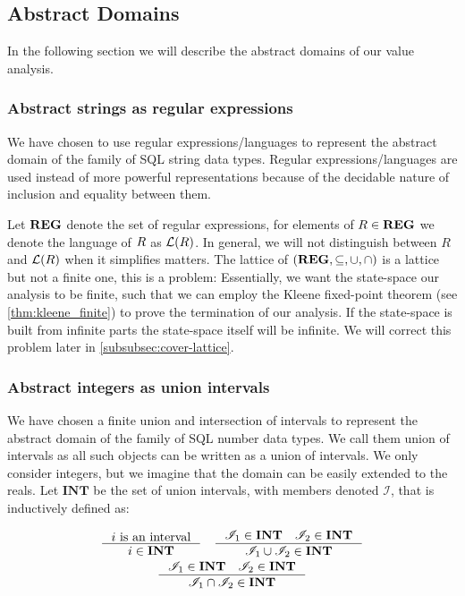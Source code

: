\subsection{Abstract Domains}\label{subsec:abstract-domains}

In the following section we will describe the abstract domains of our value analysis.

\subsubsection{Abstract strings as regular expressions}\label{subsubsec:abstract_domains_strings}
We have chosen to use regular expressions/languages to represent the abstract domain of the family of SQL string data types.
Regular expressions/languages are used instead of more powerful representations because of the decidable nature of inclusion and equality between them.

Let $\mathbf{REG}$ denote the set of regular expressions, for elements of $R \in \mathbf{REG}$ we denote the language of $R$ as $\mathcal{L}(R)$.
In general, we will not distinguish between $R$ and $\mathcal{L}(R)$ when it simplifies matters.
The lattice of $(\mathbf{REG}, \subseteq, \cup, \cap)$ is a lattice but not a finite one, this is a problem: Essentially, we want the state-space our analysis to be finite, such that we can employ the Kleene fixed-point theorem (see \autoref{thm:kleene_finite}) to prove the termination of our analysis.
If the state-space is built from infinite parts the state-space itself will be infinite.
We will correct this problem later in \autoref{subsubsec:cover-lattice}.

\subsubsection{Abstract integers as union intervals}\label{subsubsec:abstract_domains_numbers} We have chosen a finite union and intersection of intervals to represent the abstract domain of the family of SQL number data types.
We call them union of intervals as all such objects can be written as a union of intervals.
We only consider integers, but we imagine that the domain can be easily extended to the reals.
Let $\mathbf{INT}$ be the set of union intervals, with members denoted $\mathscr{I}$, that is inductively defined as:


\begin{gather*}
    \inference{i \text{ is an interval}}{i \in \mathbf{INT}} \quad
    \inference{\mathscr{I}_1 \in \textbf{INT} \quad \mathscr{I}_2 \in \textbf{INT}}{\mathscr{I}_1 \cup  \mathscr{I}_2 \in \mathbf{INT}}\\
    \inference{\mathscr{I}_1 \in \textbf{INT} \quad \mathscr{I}_2 \in \textbf{INT}}{\mathscr{I}_1 \cap  \mathscr{I}_2 \in \mathbf{INT}}
\end{gather*}


